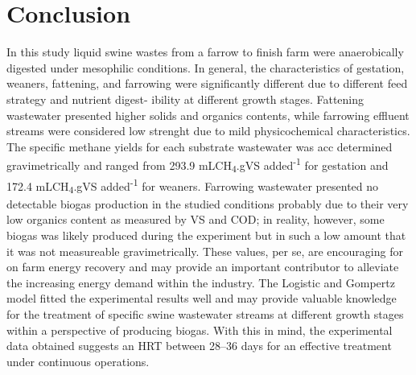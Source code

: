 \section{Conclusion}
In this study liquid swine wastes from a farrow to finish farm were anaerobically digested under mesophilic conditions. In general, the characteristics of gestation, weaners, fattening, and farrowing were significantly different due to different feed strategy and nutrient digest- ibility at different growth stages. Fattening wastewater presented higher solids and organics contents, while farrowing effluent streams were considered low strenght due to mild physicochemical characteristics. The specific methane yields for each substrate wastewater was acc determined gravimetrically  and ranged from 293.9 mLCH\textsubscript{4}.gVS added\textsuperscript{-1} for gestation and 172.4 mLCH\textsubscript{4}.gVS added\textsuperscript{-1} for weaners. Farrowing wastewater presented no detectable biogas production in the studied conditions probably due to their very low organics content as measured by VS and COD; in reality, however, some biogas was likely produced during the experiment but in such a low amount that it was not measureable gravimetrically. These values, per se, are encouraging for on farm energy recovery and may provide an important contributor to alleviate the increasing energy demand within the industry. The Logistic and Gompertz model fitted the experimental results well and may provide valuable knowledge for the treatment of specific swine wastewater streams at different growth stages within a perspective of producing biogas. With this in mind, the experimental data obtained suggests an HRT between 28–36 days for an effective treatment under continuous operations. 